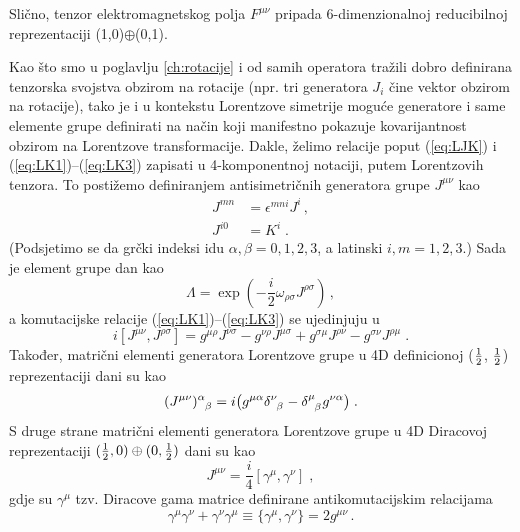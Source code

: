 Slično, tenzor elektromagnetskog polja $F^{\mu\nu}$ pripada
6-dimenzionalnoj reducibilnoj reprezentaciji (1,0)$\oplus$(0,1).


Kao što smo u poglavlju \ref{ch:rotacije} i od samih operatora tražili
dobro definirana tenzorska svojstva obzirom na rotacije
(npr. tri generatora $J_i$ čine vektor obzirom na rotacije), tako
je i u kontekstu Lorentzove simetrije moguće generatore i
same elemente grupe definirati na način koji manifestno pokazuje
kovarijantnost obzirom na Lorentzove transformacije.
Dakle, želimo relacije poput (\ref{eq:LJK}) i (\ref{eq:LK1})--(\ref{eq:LK3}) 
zapisati u 4-komponentnoj notaciji, putem Lorentzovih tenzora.
To postižemo definiranjem antisimetričnih generatora 
grupe  $J^{\mu\nu}$ kao
\begin{align}
J^{mn}& = \epsilon^{mni} J^i \,, \\
J^{i0}& = K^i \;.
\label{eq:defJmn}
\end{align}
(Podsjetimo se da grčki indeksi idu $\alpha,\beta = 0,1,2,3$, a 
latinski $i,m = 1,2,3$.)  
Sada je element grupe  dan kao
\begin{equation}
 \Lambda = \exp\left(-\frac{i}{2} \omega_{\rho\sigma} J^{\rho\sigma}\right) \,,
\label{eq:4DLorentz}
\end{equation}
a komutacijske relacije (\ref{eq:LK1})--(\ref{eq:LK3}) se ujedinjuju u
\begin{equation}
i [ J^{\mu\nu}, J^{\rho\sigma}] = g^{\mu\rho} J^{\nu\sigma}
- g^{\nu\rho} J^{\mu\sigma} + g^{\sigma\mu} J^{\rho\nu}
- g^{\sigma\nu} J^{\rho\mu} \;.
\label{eq:4DLorKom}
\end{equation}
Također, matrični elementi generatora Lorentzove grupe u
4D definicionoj ($\frac{1}{2}$, $\frac{1}{2}$) reprezentaciji dani su kao
\begin{equation}
\tensor{(J^{\mu\nu})}{^\alpha_\beta} = i \big(
g^{\mu\alpha}\tensor{\delta}{^\nu_\beta} - \tensor{\delta}{^\mu_\beta}
g^{\nu\alpha} \big) \;.
\label{eq:4DJmn}
\end{equation}
S druge strane matrični elementi generatora Lorentzove grupe u
4D Diracovoj reprezentaciji
$(\frac{1}{2}, 0) \oplus (0, \frac{1}{2})$
dani su kao
\begin{equation}
 J^{\mu\nu} = \frac{i}{4} [\gamma^\mu, \gamma^\nu] \;,
\label{eq:DiracJ}
\end{equation}
gdje su $\gamma^\mu$ tzv. Diracove gama matrice definirane
antikomutacijskim relacijama
\begin{equation}
 \gamma^\mu\gamma^\nu + \gamma^\nu \gamma^\mu
\equiv \{\gamma^\mu, \gamma^\nu\} = 2 g^{\mu\nu} \,.
\label{eq:DiracGamma}
\end{equation}
